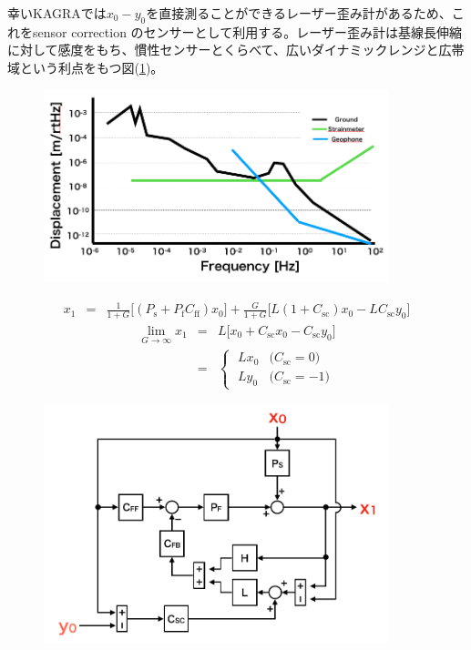 \documentclass[a4paper,12pt]{jsarticle}
\begin{document}
幸いKAGRAでは$x_0-y_0$を直接測ることができるレーザー歪み計\cite{araya2017design}があるため、これをsensor correction のセンサーとして利用する。レーザー歪み計は基線長伸縮に対して感度をもち、慣性センサーとくらべて、広いダイナミックレンジと広帯域という利点をもつ図(\ref{img:img_seismo_vs_gif})。

\begin{figure}[H]
  \begin{center}
    \includegraphics[width=10.0cm]{./img_seismo_vs_gif.png}
  \end{center}
  \caption{}\label{img:img_seismo_vs_gif}
\end{figure}



\begin{eqnarray}
  x_1 &=& \frac{1}{1+G}\Biggl[(P_{\mathrm{s}}+P_{\mathrm{f}}C_{\mathrm{ff}})x_0\Biggl]
  + \frac{G}{1+G}\Biggl[L(1+C_{\mathrm{sc}})x_0 - LC_{\mathrm{sc}}y_0\Biggl]
\end{eqnarray}
\begin{eqnarray}\label{eq:eq10}
  \lim_{G \to \infty} x_{1} &=& L\Biggl[x_0+C_{\mathrm{sc}}x_0-C_{\mathrm{sc}}y_0\Biggl] \\
  &=&  
  \begin{cases}\label{eq:eq11}
    \; Lx_{0} & \text{($C_{\mathrm{sc}}=0$)}\\
    \; Ly_{0} & \text{($C_{\mathrm{sc}}=-1$)} 
  \end{cases}  
\end{eqnarray}


\begin{figure}[H]
  \begin{center}
    \includegraphics[width=10.0cm]{./img_pi_etmx.png}
  \end{center}
  \caption{}\label{img:img_pi_etmx}
\end{figure}
\end{document}

